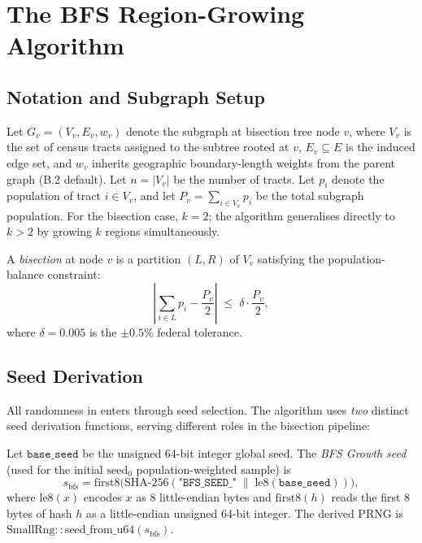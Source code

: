 \section{The BFS Region-Growing Algorithm}
\label{sec:algorithm}

\subsection{Notation and Subgraph Setup}

Let $G_v = (V_v, E_v, w_v)$ denote the subgraph at bisection tree node $v$,
where $V_v$ is the set of census tracts assigned to the subtree rooted at $v$,
$E_v \subseteq E$ is the induced edge set, and $w_v$ inherits geographic
boundary-length weights from the parent graph (B.2 default).
Let $n = |V_v|$ be the number of tracts.
Let $p_i$ denote the population of tract $i \in V_v$, and let
$P_v = \sum_{i \in V_v} p_i$ be the total subgraph population.
For the bisection case, $k = 2$; the algorithm generalises directly to
$k > 2$ by growing $k$ regions simultaneously.

A \emph{bisection} at node $v$ is a partition $(L, R)$ of $V_v$ satisfying
the population-balance constraint:
\[
  \left|\sum_{i \in L} p_i - \frac{P_v}{2}\right|
  \;\le\;
  \delta \cdot \frac{P_v}{2},
\]
where $\delta = 0.005$ is the $\pm 0.5\%$ federal tolerance.

\subsection{Seed Derivation}

All randomness in \bfsg{} enters through seed selection.
The algorithm uses \emph{two} distinct seed derivation functions, serving
different roles in the bisection pipeline:

\begin{definition}
\label{def:bfs-seed}
Let $\mathtt{base\_seed}$ be the unsigned 64-bit integer global seed.
The \emph{BFS Growth seed} (used for the initial $\mathrm{seed}_0$
population-weighted sample) is
\[
  s_{\mathrm{bfs}} = \mathrm{first8}\bigl(
    \mathrm{SHA\text{-}256}(
      \texttt{"BFS\_SEED\_"} \;\|\; \mathrm{le8}(\mathtt{base\_seed})
    )
  \bigr),
\]
where $\mathrm{le8}(x)$ encodes $x$ as 8 little-endian bytes and
$\mathrm{first8}(h)$ reads the first 8 bytes of hash $h$ as a
little-endian unsigned 64-bit integer.
The derived PRNG is $\mathrm{SmallRng::seed\_from\_u64}(s_{\mathrm{bfs}})$.
\end{definition}

